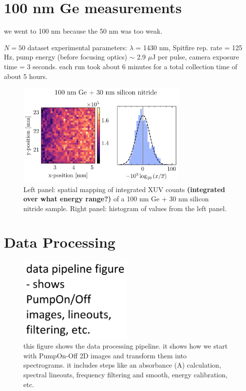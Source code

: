 \section{100 nm Ge measurements}
we went to 100 nm because the 50 nm was too weak.

$N=50$ dataset experimental parameters: $\lambda$ = 1430 nm, Spitfire rep. rate = 125 Hz, pump energy (before focusing optics) $\sim$ 2.9 $\mu$J per pulse, camera exposure time = 3 seconds. each run took about 6 minutes for a total collection time of about 5 hours. 

\begin{figure}
	\centering
	\includegraphics[width=0.75\textwidth]{figures/chap3/Ge_map.png}
	\caption{Left panel: spatial mapping of integrated XUV counts \textbf{(integrated over what energy range?)} of a 100 nm Ge + 30 nm silicon nitride sample. Right panel: histogram of values from the left panel.}
	\label{fig:Ge_map}
\end{figure}

\section{Data Processing}

\begin{figure}
	\centering
	\includegraphics[width=0.5\textwidth]{figures/chap3/Data_Pipeline.png}
	\caption{this figure shows the data processing pipeline. it shows how we start with PumpOn-Off 2D images and transform them into spectrograms. it includes steps like an absorbance (A) calculation, spectral lineouts, frequency filtering and smooth, energy calibration, etc.}
	\label{fig:Data_Pipeline}
\end{figure}

